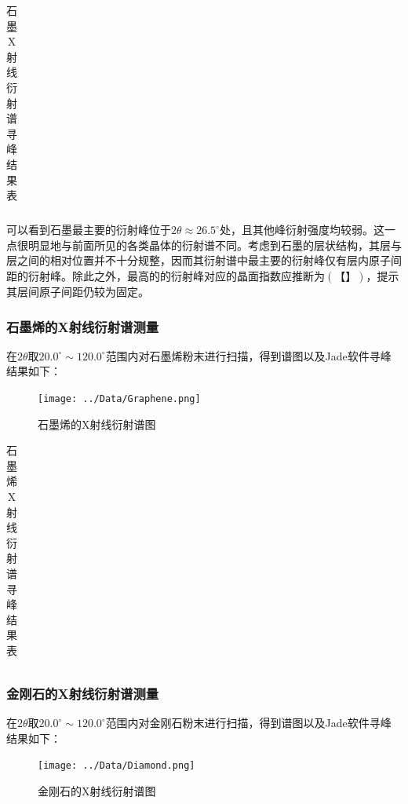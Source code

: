 \documentclass{thuemp}
\begin{document}
\begin{table}
    \centering
    \captionnamefont{\wuhao\bf\heiti}
    \captiontitlefont{\wuhao\bf\heiti}
    \caption{石墨X射线衍射谱寻峰结果表}
    \label{tab:graphite_xrd}
    \liuhao
    \begin{tabular}{ccccc}
        \toprule
        \midrule
        \bottomrule
    \end{tabular}
\end{table}

可以看到石墨最主要的衍射峰位于$2\theta \approx 26.5^\circ$处，且其他峰衍射强度均较弱。这一点很明显地与前面所见的各类晶体的衍射谱不同。考虑到石墨的层状结构，其层与层之间的相对位置并不十分规整，因而其衍射谱中最主要的衍射峰仅有层内原子间距的衍射峰。除此之外，最高的的衍射峰对应的晶面指数应推断为$(【】)$，提示其层间原子间距仍较为固定。

\subsubsection{石墨烯的X射线衍射谱测量}

在$2\theta$取$20.0^\circ \sim 120.0^\circ$范围内对石墨烯粉末进行扫描，得到谱图以及Jade软件寻峰结果如下： 

\begin{figure}[H]
    \centering
    \texttt{[image: ../Data/Graphene.png]}
    \caption{石墨烯的X射线衍射谱图}
    \label{fig:graphene_xrd}
\end{figure}

\begin{table}
    \centering
    \captionnamefont{\wuhao\bf\heiti}
    \captiontitlefont{\wuhao\bf\heiti}
    \caption{石墨烯X射线衍射谱寻峰结果表}
    \label{tab:graphene_xrd}
    \liuhao
    \begin{tabular}{ccccc}
        \toprule
        \midrule
        \bottomrule
    \end{tabular}
\end{table}



\subsubsection{金刚石的X射线衍射谱测量}

在$2\theta$取$20.0^\circ \sim 120.0^\circ$范围内对金刚石粉末进行扫描，得到谱图以及Jade软件寻峰结果如下：

\begin{figure}[H]
    \centering
    \texttt{[image: ../Data/Diamond.png]}
    \caption{金刚石的X射线衍射谱图}
    \label{fig:diamond_xrd}
\end{figure}
\end{document}
